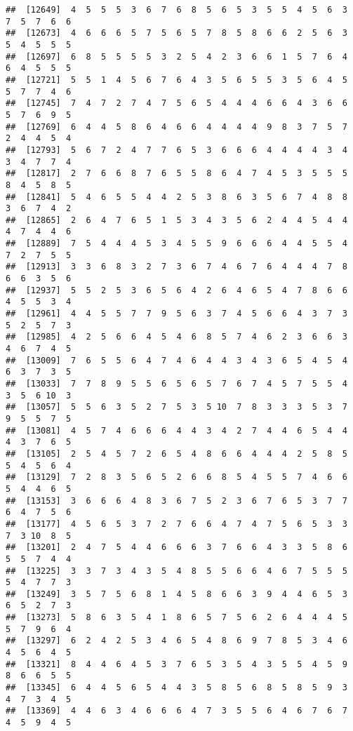 \documentclass[
]{book}
\begin{document}
\begin{verbatim}
##  [12649]  4  5  5  5  3  6  7  6  8  5  6  5  3  5  5  4  5  6  3  7  5  7  6  6
##  [12673]  4  6  6  6  5  7  5  6  5  7  8  5  8  6  6  2  5  6  3  5  4  5  5  5
##  [12697]  6  8  5  5  5  5  3  2  5  4  2  3  6  6  1  5  7  6  4  6  4  5  5  5
##  [12721]  5  5  1  4  5  6  7  6  4  3  5  6  5  5  3  5  6  4  5  5  7  7  4  6
##  [12745]  7  4  7  2  7  4  7  5  6  5  4  4  4  6  6  4  3  6  6  5  7  6  9  5
##  [12769]  6  4  4  5  8  6  4  6  6  4  4  4  4  9  8  3  7  5  7  2  4  4  5  4
##  [12793]  5  6  7  2  4  7  7  6  5  3  6  6  6  4  4  4  4  3  4  3  4  7  7  4
##  [12817]  2  7  6  6  8  7  6  5  5  8  6  4  7  4  5  3  5  5  5  8  4  5  8  5
##  [12841]  5  4  6  5  5  4  4  2  5  3  8  6  3  5  6  7  4  8  8  3  6  7  4  2
##  [12865]  2  6  4  7  6  5  1  5  3  4  3  5  6  2  4  4  5  4  4  4  7  4  4  6
##  [12889]  7  5  4  4  4  5  3  4  5  5  9  6  6  6  4  4  5  5  4  7  2  7  5  5
##  [12913]  3  3  6  8  3  2  7  3  6  7  4  6  7  6  4  4  4  7  8  6  6  3  5  6
##  [12937]  5  5  2  5  3  6  5  6  4  2  6  4  6  5  4  7  8  6  6  4  5  5  3  4
##  [12961]  4  4  5  5  7  7  9  5  6  3  7  4  5  6  6  4  3  7  3  5  2  5  7  3
##  [12985]  4  2  5  6  6  4  5  4  6  8  5  7  4  6  2  3  6  6  3  4  6  7  4  5
##  [13009]  7  6  5  5  6  4  7  4  6  4  4  3  4  3  6  5  4  5  4  6  3  7  3  5
##  [13033]  7  7  8  9  5  5  6  5  6  5  7  6  7  4  5  7  5  5  4  3  5  6 10  3
##  [13057]  5  5  6  3  5  2  7  5  3  5 10  7  8  3  3  3  5  3  7  9  5  5  7  5
##  [13081]  4  5  7  4  6  6  6  4  4  3  4  2  7  4  4  6  5  4  4  4  3  7  6  5
##  [13105]  2  5  4  5  7  2  6  5  4  8  6  6  4  4  4  2  5  8  5  5  4  5  6  4
##  [13129]  7  2  8  3  5  6  5  2  6  6  8  5  4  5  5  7  4  6  6  5  4  4  6  5
##  [13153]  3  6  6  6  4  8  3  6  7  5  2  3  6  7  6  5  3  7  7  6  4  7  5  6
##  [13177]  4  5  6  5  3  7  2  7  6  6  4  7  4  7  5  6  5  3  3  7  3 10  8  5
##  [13201]  2  4  7  5  4  4  6  6  6  3  7  6  6  4  3  3  5  8  6  5  5  7  4  4
##  [13225]  3  3  7  3  4  3  5  4  8  5  5  6  6  4  6  7  5  5  5  5  4  7  7  3
##  [13249]  3  5  7  5  6  8  1  4  5  8  6  6  3  9  4  4  6  5  3  6  5  2  7  3
##  [13273]  5  8  6  3  5  4  1  8  6  5  7  5  6  2  6  4  4  4  5  5  7  9  6  4
##  [13297]  6  2  4  2  5  3  4  6  5  4  8  6  9  7  8  5  3  4  6  4  5  6  4  5
##  [13321]  8  4  4  6  4  5  3  7  6  5  3  5  4  3  5  5  4  5  9  8  6  6  5  5
##  [13345]  6  4  4  5  6  5  4  4  3  5  8  5  6  8  5  8  5  9  3  4  7  3  4  5
##  [13369]  4  4  6  3  4  6  6  6  4  7  3  5  5  6  4  6  7  6  7  4  5  9  4  5

\end{verbatim}
\end{document}

